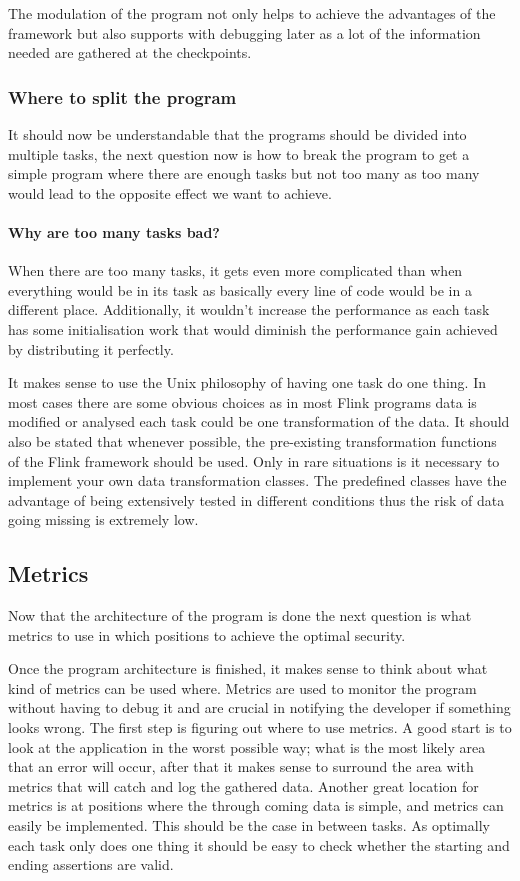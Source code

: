 The modulation of the program not only helps to achieve the advantages of the framework but also supports with debugging later as a lot of the information needed are gathered at the checkpoints.

\subsubsection{Where to split the program}
It should now be understandable that the programs should be divided into multiple tasks, the next question now is how to break the program to get a simple program where there are enough tasks but not too many as too many would lead to the opposite effect we want to achieve.

\paragraph{Why are too many tasks bad?} When there are too many tasks, it gets even more complicated than when everything would be in its task as basically every line of code would be in a different place. Additionally, it wouldn't increase the performance as each task has some initialisation work that would diminish the performance gain achieved by distributing it perfectly.

It makes sense to use the Unix philosophy of having one task do one thing. In most cases there are some obvious choices as in most Flink programs data is modified or analysed each task could be one transformation of the data. It should also be stated that whenever possible, the pre-existing transformation functions of the Flink framework should be used. Only in rare situations is it necessary to implement your own data transformation classes. The predefined classes have the advantage of being extensively tested in different conditions thus the risk of data going missing is extremely low.

\subsection{Metrics}
Now that the architecture of the program is done the next question is what metrics to use in which positions to achieve the optimal security.

Once the program architecture is finished, it makes sense to think about what kind of metrics can be used where. Metrics are used to monitor the program without having to debug it and are crucial in notifying the developer if something looks wrong. The first step is figuring out where to use metrics. A good start is to look at the application in the worst possible way; what is the most likely area that an error will occur, after that it makes sense to surround the area with metrics that will catch and log the gathered data. Another great location for metrics is at positions where the through coming data is simple, and metrics can easily be implemented. This should be the case in between tasks. As optimally each task only does one thing it should be easy to check whether the starting and ending assertions are valid.

